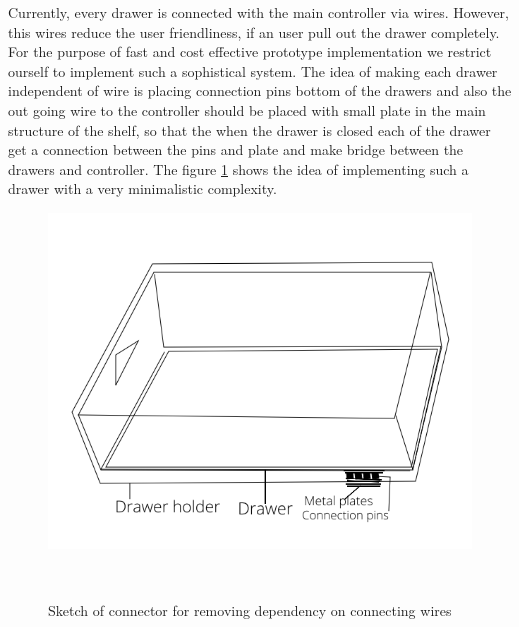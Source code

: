 Currently, every drawer is connected with the main controller via wires. 
However, this wires reduce the user friendliness, if an user pull out the drawer completely. 
For the purpose of fast and cost effective prototype implementation we restrict ourself to implement such a sophistical system. 
The idea of making each drawer independent of wire is placing connection pins bottom of the drawers and also the out going wire to the controller 
should be placed with small plate in the main structure of the shelf, so that the when the drawer is closed each of the drawer get a connection between the pins and plate and make bridge between the drawers and controller.
The figure \ref{fig:connector} shows the idea of implementing such a drawer with a very minimalistic complexity.
%
\begin{figure}
	\includegraphics[width=1\columnwidth]{figures/example_drawer}
	\caption{Sketch of connector for removing dependency on connecting wires}~\label{fig:connector}
\end{figure}
%